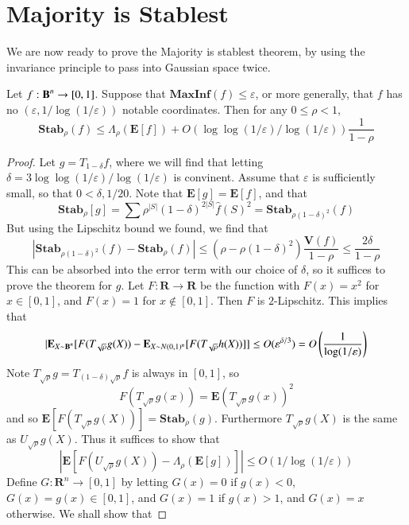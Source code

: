 \section{Majority is Stablest}

We are now ready to prove the Majority is stablest theorem, by using the invariance principle to pass into Gaussian space twice.

\begin{theorem}
    Let $f: \operatorname{\mathbf{B}}^n \to [0,1]$. Suppose that $\mathbf{MaxInf}(f) \leq \varepsilon$, or more generally, that $f$ has no $(\varepsilon, 1/\log(1/\varepsilon))$ notable coordinates. Then for any $0 \leq \rho < 1$,
    \[ \mathbf{Stab}_\rho(f) \leq \Lambda_\rho(\mathbf{E}[f]) + O(\log \log(1/\varepsilon)/\log(1/\varepsilon)) \frac{1}{1 - \rho} \]
\end{theorem}
\begin{proof}
    Let $g = T_{1 - \delta} f$, where we will find that letting $\delta = 3 \log \log (1/\varepsilon)/\log(1/\varepsilon)$ is convinent. Assume that $\varepsilon$ is sufficiently small, so that $0 < \delta , 1/20$. Note that $\mathbf{E}[g] = \mathbf{E}[f]$, and that
    \[ \mathbf{Stab}_\rho[g] = \sum \rho^{|S|} (1 - \delta)^{2|S|} \widehat{f}(S)^2 = \mathbf{Stab}_{\rho(1 - \delta)^2}(f) \]
    But using the Lipschitz bound we found, we find that
    \[ |\mathbf{Stab}_{\rho(1-\delta)^2}(f) - \mathbf{Stab}_\rho(f) | \leq (\rho - \rho(1 - \delta)^2) \frac{\mathbf{V}(f)}{1 - \rho} \leq \frac{2 \delta}{1 - \rho} \]
    This can be absorbed into the error term with our choice of $\delta$, so it suffices to prove the theorem for $g$. Let $F: \mathbf{R} \to \mathbf{R}$ be the function with $F(x) = x^2$ for $x \in [0,1]$, and $F(x) = 1$ for $x \not \in [0,1]$. Then $F$ is $2$-Lipschitz. This implies that
    \[| \mathbf{E}_{X \sim \operatorname{\mathbf{B}}^n} [F(T_{\sqrt{\rho}} g(X)) - \mathbf{E}_{X \sim N(0,1)^n}[F(T_{\sqrt{\rho}} h(X))]] \leq O(\varepsilon^{\delta/3}) = O\left(\frac{1}{\log(1/\varepsilon)} \right) \]
    Note $T_{\sqrt{\rho}} g = T_{(1-\delta)\sqrt{\rho}} f$ is always in $[0,1]$, so
    \[ F(T_{\sqrt{\rho}} g(x)) = \mathbf{E}(T_{\sqrt{\rho}} g(x))^2 \]
    and so $\mathbf{E}[F(T_{\sqrt{\rho}} g(X))] = \mathbf{Stab}_\rho(g)$. Furthermore $T_{\sqrt{\rho}} g(X)$ is the same as $U_{\sqrt{\rho}} g(X)$. Thus it suffices to show that
    \[ |\mathbf{E}[F(U_{\sqrt{\rho}} g(X)) - \Lambda_\rho(\mathbf{E}[g])]| \leq O(1/\log(1/\varepsilon)) \]
    Define $G: \mathbf{R}^n \to [0,1]$ by letting $G(x) = 0$ if $g(x) < 0$, $G(x) = g(x) \in [0,1]$, and $G(x) = 1$ if $g(x) > 1$, and $G(x) = x$ otherwise. We shall show that

\end{proof}
